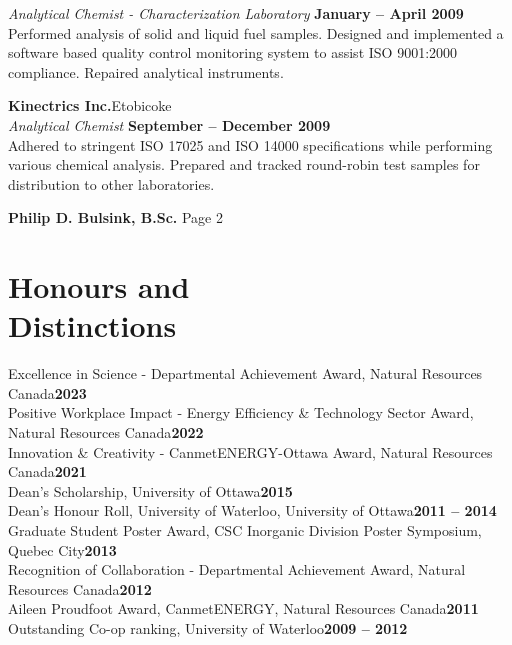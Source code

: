 \documentclass[margin,line]{resumecls}
\begin{document}
\begin{resume}
    \textsl{Analytical Chemist - Characterization Laboratory} \hfill \textbf{January -- April 2009}\\
    Performed analysis of solid and liquid fuel samples.
    Designed and implemented a software based quality control monitoring system to assist ISO 9001:2000 compliance.
    Repaired analytical instruments.

    \textbf{Kinectrics Inc.}\hfill Etobicoke\\\vspace{1mm}%
    \textsl{Analytical Chemist} \hfill \textbf{September -- December 2009}\\
    Adhered to stringent ISO 17025 and ISO 14000 specifications while performing various chemical analysis.
    Prepared and tracked round-robin test samples for distribution to other laboratories.

\newpage
	\textbf{Philip D. Bulsink, B.Sc.} \hspace{279pt} Page 2 \\
	\vspace{-4mm}
    \section{\mysidestyle Honours and\\Distinctions}

    Excellence in Science - Departmental Achievement Award,  Natural Resources Canada\hfill\textbf{2023}\vspace{1mm}\\%
    Positive Workplace Impact - Energy Efficiency \& Technology Sector Award, Natural Resources Canada\hfill\textbf{2022}\vspace{1mm}\\%
    Innovation \& Creativity - CanmetENERGY-Ottawa Award, Natural Resources Canada\hfill\textbf{2021}\vspace{1mm}\\%
    Dean's Scholarship, University of Ottawa\hfill\textbf{2015}\vspace{1mm}\\%
    Dean's Honour Roll, University of Waterloo, University of Ottawa\hfill\textbf{2011 -- 2014}\vspace{1mm}\\%
    Graduate Student Poster Award, CSC Inorganic Division Poster Symposium, Quebec City\hfill\textbf{2013}\vspace{1mm}\\%
    Recognition of Collaboration - Departmental Achievement Award, Natural Resources Canada\hfill\textbf{2012}\vspace{1mm}\\%
    Aileen Proudfoot Award, CanmetENERGY, Natural Resources Canada\hfill\textbf{2011}\vspace{1mm}\\%
    Outstanding Co-op ranking, University of Waterloo\hfill\textbf{2009 -- 2012}\vspace{1mm}%


\end{resume}
\end{document}
